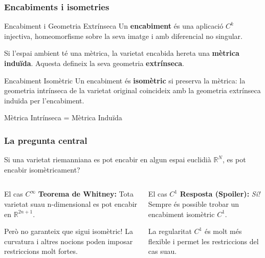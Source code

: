 \documentclass[10pt]{beamer}
\begin{document}
\begin{frame}
    \frametitle{Encabiments i isometries}

    \begin{block}{Encabiment i Geometria Extrínseca}
        Un \textbf{encabiment} és una aplicació $C^k$ injectiva, homeomorfisme sobre la seva imatge i amb diferencial no singular.
        
        Si l'espai ambient té una mètrica, la varietat encabida hereta una \textbf{mètrica induïda}. Aquesta defineix la seva geometria \textbf{extrínseca}.
    \end{block}
    \pause
    
    \begin{block}{Encabiment Isomètric}
        Un encabiment és \textbf{isomètric} si preserva la mètrica: la geometria intrínseca de la varietat original coincideix amb la geometria extrínseca induïda per l'encabiment.
        
        \vspace{0.5cm}
        \centering
        \alert{Mètrica Intrínseca = Mètrica Induïda}
    \end{block}
    
\end{frame}

\begin{frame}
    \frametitle{La pregunta central}
    
    \begin{center}
        \LARGE
        Si una varietat riemanniana es pot encabir en algun espai euclidià $\mathbb{R}^N$, es pot encabir isomètricament?
    \end{center}
    
    \pause
    
    \begin{columns}
        \begin{column}{0.5\textwidth}
            \begin{block}{El cas $C^\infty$}
                \textbf{Teorema de Whitney:} Tota varietat suau n-dimensional es pot encabir en $\mathbb{R}^{2n+1}$.
                \vspace{0.3cm}
                
                \alert{Però no garanteix que sigui isomètric!} La curvatura i altres nocions poden imposar restriccions molt fortes.
            \end{block}
        \end{column}
        \begin{column}{0.5\textwidth}
            \begin{block}{El cas $C^1$}
                \textbf{Resposta (Spoiler):} \textit{Sí! } Sempre és possible trobar un encabiment isomètric $C^1$.
                 \vspace{0.3cm}
                
                La regularitat $C^1$ és molt més flexible i permet  les restriccions del cas suau.
            \end{block}
        \end{column}
    \end{columns}
    
\end{frame}
\end{document}
